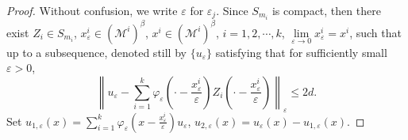 \documentclass[12pt,reqno]{amsart}
\numberwithin{equation}{section}
\begin{document}
\begin{proof}
Without confusion, we write ${\varepsilon}$ for ${\varepsilon}_j$. Since
$S_{m_i}$ is compact, then there exist $Z_i\in S_{m_i}$,
$x_{\varepsilon}^i\in (\mathcal {M}^i)^{\beta}$, $x^i\in (\mathcal
{M}^i)^{\beta}$, $i=1,2,\cdots,k$, $\lim\limits_{{\varepsilon}\rightarrow
0}x_{\varepsilon}^i=x^i$, such that up to a subsequence, denoted still by
$\{u_{\varepsilon}\}$ satisfying that for sufficiently small ${\varepsilon}>0$,
\begin{equation}\label{4sec30}
\left\|u_{\varepsilon}-\sum\limits_{i=1}^k\varphi_{\varepsilon}\left(\cdot
-\frac{x_{\varepsilon}^i}{\varepsilon}\right)Z_i\left(\cdot
-\frac{x_{\varepsilon}^i}{\varepsilon}\right)\right\|_{\varepsilon}\leq 2d.
\end{equation}
Set $u_{1,{\varepsilon}}(x)=\sum\limits_{i=1}^k\varphi_{\varepsilon}\left(x
-\frac{x_{\varepsilon}^i}{\varepsilon}\right)u_{\varepsilon}$,
$u_{2,{\varepsilon}}(x)=u_{\varepsilon}(x)-u_{1,{\varepsilon}}(x)$.


\end{proof}
\end{document}
